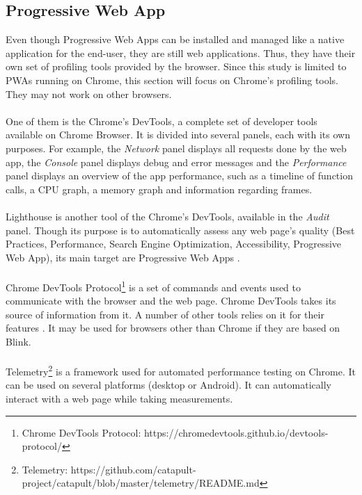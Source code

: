 \documentclass{kththesis}
\begin{document}
\subsection{Progressive Web App}

Even though Progressive Web Apps can be installed and managed like a native application for the end-user, they are still web applications. Thus, they have their own set of profiling tools provided by the browser. Since this study is limited to PWAs running on Chrome, this section will focus on Chrome's profiling tools. They may not work on other browsers.

\paragraph{}
One of them is the Chrome's DevTools, a complete set of developer tools available on Chrome Browser. It is divided into several panels, each with its own purposes. For example, the \textit{Network} panel displays all requests done by the web app, the \textit{Console} panel displays debug and error messages and the \textit{Performance} panel \cite{chrome_devtools_perf} displays an overview of the app performance, such as a timeline of function calls, a CPU graph, a memory graph and information regarding frames. 

\paragraph{}
Lighthouse \cite{lighthouse} is another tool of the Chrome's DevTools, available in the \textit{Audit} panel. Though its purpose is to automatically assess any web page's quality (Best Practices, Performance, Search Engine Optimization, Accessibility, Progressive Web App), its main target are Progressive Web Apps \cite{PWApossibleUnifer}. 

\paragraph{}
Chrome DevTools Protocol\footnote{Chrome DevTools Protocol: https://chromedevtools.github.io/devtools-protocol/} is a set of commands and events used to communicate with the browser and the web page. Chrome DevTools takes its source of information from it. A number of other tools relies on it for their features \cite{awesome_CDP}. It may be used for browsers other than Chrome if they are based on Blink.

\paragraph{}
Telemetry\footnote{Telemetry: https://github.com/catapult-project/catapult/blob/master/telemetry/README.md} is a framework used for automated performance testing on Chrome. It can be used on several platforms (desktop or Android). It can automatically interact with a web page while taking measurements. 
\end{document}
